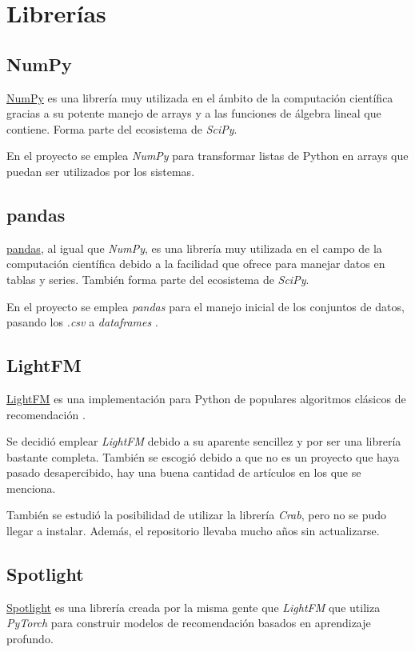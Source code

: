 \section{Librerías}\label{librerias}
\subsection{NumPy}\label{numpy}
\href{http://www.numpy.org/}{NumPy} es una librería muy utilizada en el ámbito de la computación científica gracias a su potente manejo de arrays y a las funciones de álgebra lineal que contiene. Forma parte del ecosistema de \textit{SciPy}.

En el proyecto se emplea \textit{NumPy} para transformar listas de Python en arrays que puedan ser utilizados por los sistemas.

\subsection{pandas}\label{pandas}
\href{http://pandas.pydata.org/}{pandas}, al igual que \textit{NumPy}, es una librería muy utilizada en el campo de la computación científica debido a la facilidad que ofrece para manejar datos en tablas y series. También forma parte del ecosistema de \textit{SciPy}.

En el proyecto se emplea \textit{pandas} para el manejo inicial de los conjuntos de datos, pasando los \textit{.csv} a \textit{dataframes} \cite{dataframes}.

\subsection{LightFM}\label{lightfm}
\href{https://github.com/lyst/lightfm}{LightFM} es una implementación para Python de populares algoritmos clásicos de recomendación \cite{kulalightfm}.

Se decidió emplear \textit{LightFM} debido a su aparente sencillez y por ser una librería bastante completa. También se escogió debido a que no es un proyecto que haya pasado desapercibido, hay una buena cantidad de artículos en los que se menciona.

También se estudió la posibilidad de utilizar la librería \textit{Crab}, pero no se pudo llegar a instalar. Además, el repositorio llevaba mucho años sin actualizarse.

\subsection{Spotlight}\label{spotlight}
\href{https://github.com/maciejkula/spotlight}{Spotlight} es una librería creada por la misma gente que \textit{LightFM} que utiliza \textit{PyTorch} para construir modelos de recomendación \cite{kula2017spotlight} basados en aprendizaje profundo.

